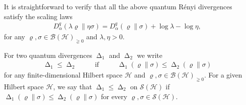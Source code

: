 \documentclass[unsortedaddress,superscriptaddress,pra,notitlepage]{revtex4}
\def\B{{\mathcal B}}
\def\S{{\mathcal S}}
\def\rho{\varrho}
\def\hil{{\mathcal H}}
\def\pne{_{\gneq 0}}
\newcommand{\ds}{\mbox{ }\mbox{ }}
\DeclareMathOperator{\divv}{\Delta}
\begin{document}
It is straightforward to verify that all the above quantum R\'enyi divergences satisfy the scaling laws
\begin{align}\label{scaling}
D_{\alpha}^q(\lambda\rho\|\eta\sigma)
=
D_{\alpha}^q(\rho\|\sigma)+\log\lambda-\log\eta,
\end{align}
for any $\rho,\sigma\in\B(\hil)\pne$ and $\lambda,\eta>0$.

For two quantum divergences $\divv_1$ and $\divv_2$ we write
\begin{align*}
\divv_1\le \divv_2\ds\ds\text{if}\ds\ds
\divv_1(\rho\|\sigma)\le \divv_2(\rho\|\sigma)
\end{align*}
for any 
finite-dimensional Hilbert space $\hil$ and 
$\rho,\sigma\in\B(\hil)\pne$.
For a given Hilbert space $\hil$, we say that $\divv_1\le\divv_2$ on $\S(\hil)$ if 
$\divv_1(\rho\|\sigma)\le\divv_2(\rho\|\sigma)$ for every $\rho,\sigma\in\S(\hil)$.
\end{document}
